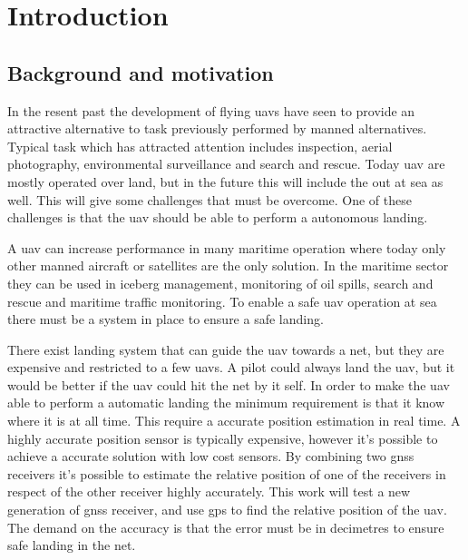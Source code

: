 
\chapter{Introduction}

\section{Background and motivation}
In the resent past the development of flying \glspl{uav} have seen to provide an attractive alternative to task previously performed by manned alternatives. Typical task which has attracted attention includes inspection, aerial photography, environmental surveillance and search and rescue. Today \gls{uav} are mostly operated over land, but in the future this will include the out at sea as well. This will give some challenges that must be overcome. One of these challenges is that the \gls{uav} should be able to perform a autonomous landing.

A \gls{uav} can increase performance in many maritime operation where today only other manned aircraft or satellites are the only solution. In the maritime sector they can be used in iceberg management, monitoring of oil spills, search and rescue and maritime traffic monitoring. To enable a safe \gls{uav} operation at sea there must be a system in place to ensure a safe landing.

There exist landing system that can guide the \gls{uav} towards a net, but they are expensive and restricted to a few \glspl{uav}. A pilot could always land the \gls{uav}, but it would be better if the \gls{uav} could hit the net by it self. In order to make the \gls{uav} able to perform a automatic landing the minimum requirement is that it know where it is at all time. This require a accurate position estimation in real time. A highly accurate position sensor is typically expensive, however it's possible to achieve a accurate solution with low cost sensors. By combining two \gls{gnss} receivers it's possible to estimate the relative position of one of the receivers in respect of the other receiver highly accurately. This work will test a new generation of \gls{gnss} receiver, and use \gls{gps} to find the relative position of the \gls{uav}. The demand on the accuracy is that the error must be in decimetres to ensure safe landing in the net.

